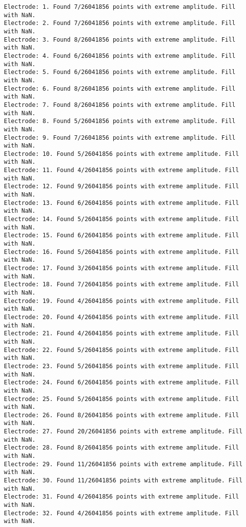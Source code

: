 \documentclass[11pt]{article}
\begin{document}
    \begin{Verbatim}[commandchars=\\\{\}]
Electrode: 1. Found 7/26041856 points with extreme amplitude. Fill with NaN.
Electrode: 2. Found 7/26041856 points with extreme amplitude. Fill with NaN.
Electrode: 3. Found 8/26041856 points with extreme amplitude. Fill with NaN.
Electrode: 4. Found 6/26041856 points with extreme amplitude. Fill with NaN.
Electrode: 5. Found 6/26041856 points with extreme amplitude. Fill with NaN.
Electrode: 6. Found 8/26041856 points with extreme amplitude. Fill with NaN.
Electrode: 7. Found 8/26041856 points with extreme amplitude. Fill with NaN.
Electrode: 8. Found 5/26041856 points with extreme amplitude. Fill with NaN.
Electrode: 9. Found 7/26041856 points with extreme amplitude. Fill with NaN.
Electrode: 10. Found 5/26041856 points with extreme amplitude. Fill with NaN.
Electrode: 11. Found 4/26041856 points with extreme amplitude. Fill with NaN.
Electrode: 12. Found 9/26041856 points with extreme amplitude. Fill with NaN.
Electrode: 13. Found 6/26041856 points with extreme amplitude. Fill with NaN.
Electrode: 14. Found 5/26041856 points with extreme amplitude. Fill with NaN.
Electrode: 15. Found 6/26041856 points with extreme amplitude. Fill with NaN.
Electrode: 16. Found 5/26041856 points with extreme amplitude. Fill with NaN.
Electrode: 17. Found 3/26041856 points with extreme amplitude. Fill with NaN.
Electrode: 18. Found 7/26041856 points with extreme amplitude. Fill with NaN.
Electrode: 19. Found 4/26041856 points with extreme amplitude. Fill with NaN.
Electrode: 20. Found 4/26041856 points with extreme amplitude. Fill with NaN.
Electrode: 21. Found 4/26041856 points with extreme amplitude. Fill with NaN.
Electrode: 22. Found 5/26041856 points with extreme amplitude. Fill with NaN.
Electrode: 23. Found 5/26041856 points with extreme amplitude. Fill with NaN.
Electrode: 24. Found 6/26041856 points with extreme amplitude. Fill with NaN.
Electrode: 25. Found 5/26041856 points with extreme amplitude. Fill with NaN.
Electrode: 26. Found 8/26041856 points with extreme amplitude. Fill with NaN.
Electrode: 27. Found 20/26041856 points with extreme amplitude. Fill with NaN.
Electrode: 28. Found 8/26041856 points with extreme amplitude. Fill with NaN.
Electrode: 29. Found 11/26041856 points with extreme amplitude. Fill with NaN.
Electrode: 30. Found 11/26041856 points with extreme amplitude. Fill with NaN.
Electrode: 31. Found 4/26041856 points with extreme amplitude. Fill with NaN.
Electrode: 32. Found 4/26041856 points with extreme amplitude. Fill with NaN.

    \end{Verbatim}
\end{document}
